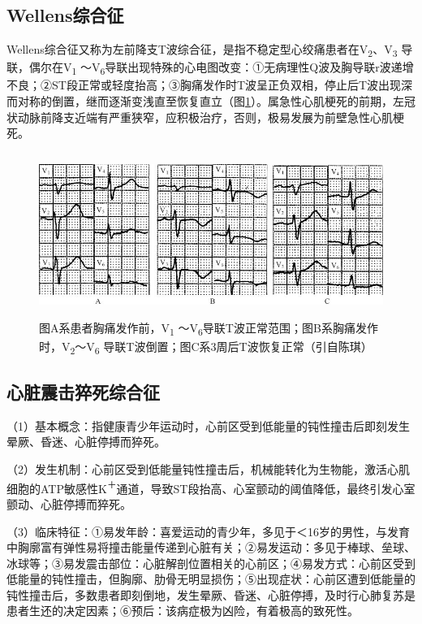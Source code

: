 \protect\hypertarget{text00047.htmlux5cux23subid574}{}{}

\subsection{Wellens综合征}

Wellens综合征又称为左前降支T波综合征，是指不稳定型心绞痛患者在V\textsubscript{2}、V\textsubscript{3} 导联，偶尔在V\textsubscript{1} ～V\textsubscript{6}导联出现特殊的心电图改变：①无病理性Q波及胸导联r波递增不良；②ST段正常或轻度抬高；③胸痛发作时T波呈正负双相，停止后T波出现深而对称的倒置，继而逐渐变浅直至恢复直立（图\ref{fig40-17}）。属急性心肌梗死的前期，左冠状动脉前降支近端有严重狭窄，应积极治疗，否则，极易发展为前壁急性心肌梗死。

\begin{figure}[!htbp]
 \centering
 \includegraphics[width=5.16667in,height=2.10417in]{./images/Image00679.jpg}
 \captionsetup{justification=centering}
 \caption{图A系患者胸痛发作前，V\textsubscript{1} ～V\textsubscript{6}导联T波正常范围；图B系胸痛发作时，V\textsubscript{2}～V\textsubscript{6} 导联T波倒置；图C系3周后T波恢复正常（引自陈琪）}
 \label{fig40-17}
  \end{figure} 


\protect\hypertarget{text00047.htmlux5cux23subid575}{}{}

\subsection{心脏震击猝死综合征}

（1）基本概念：指健康青少年运动时，心前区受到低能量的钝性撞击后即刻发生晕厥、昏迷、心脏停搏而猝死。

（2）发生机制：心前区受到低能量钝性撞击后，机械能转化为生物能，激活心肌细胞的ATP敏感性K\textsuperscript{＋}通道，导致ST段抬高、心室颤动的阈值降低，最终引发心室颤动、心脏停搏而猝死。

（3）临床特征：①易发年龄：喜爱运动的青少年，多见于＜16岁的男性，与发育中胸廓富有弹性易将撞击能量传递到心脏有关；②易发运动：多见于棒球、垒球、冰球等；③易发震击部位：心脏解剖位置相关的心前区；④易发方式：心前区受到低能量的钝性撞击，但胸廓、肋骨无明显损伤；⑤出现症状：心前区遭到低能量的钝性撞击后，多数患者即刻倒地，发生晕厥、昏迷、心脏停搏，及时行心肺复苏是患者生还的决定因素；⑥预后：该病症极为凶险，有着极高的致死性。

